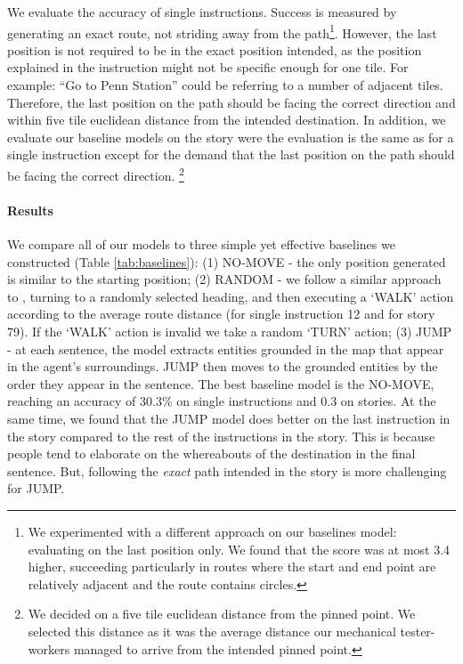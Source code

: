 \documentclass[11pt,a4paper]{article}
\begin{document}
We evaluate the accuracy of single instructions. Success is measured by generating an exact route, not striding away from the path\footnote{We experimented with a different approach on our baselines model: evaluating on the last position only. We found that the score was at most 3.4 higher, succeeding particularly in routes where the start and end point are relatively adjacent and the route contains circles.}. However, the last position is not required to be in the exact position intended, as the position explained in the instruction might not be specific enough for one tile. For example: \enquote{Go to Penn Station} could be referring to a number of adjacent tiles. Therefore, the last position on the path should be facing the correct direction and within five tile euclidean distance from the intended destination. In addition, we evaluate our baseline models on the story were the evaluation is the same as for a single instruction except for the demand that the last position on the path should be facing the correct direction. \footnote{We decided on a five tile euclidean distance from the pinned point. We selected this distance as it was the average distance our mechanical tester-workers managed to arrive from the intended pinned point.} 



\paragraph{Results}


We compare all of our models to three simple yet effective baselines we constructed (Table \ref{tab:baselines}): (1) NO-MOVE - the only position generated is similar to the starting position; (2) RANDOM - we follow a similar approach to \citet{anderson2018vision}, turning to a randomly selected heading, and then executing a \enquote*{WALK} action according to the average route distance (for single instruction 12 and for story 79). If the \enquote*{WALK} action is invalid we take a random \enquote*{TURN} action; (3) JUMP - at each sentence, the model extracts entities grounded in the map that appear in the agent's surroundings. JUMP then moves to the grounded entities by the order they appear in the sentence.
The best baseline model is the NO-MOVE, reaching an accuracy of 30.3\% on single instructions and 0.3 on stories. At the same time,
we found that the JUMP model does better on the last instruction in the story compared to the rest of the instructions in the story. This is because people tend to elaborate on the whereabouts of the destination in the final sentence. But, following the {\em exact} path intended in the story is more challenging for JUMP.   \par
\end{document}
